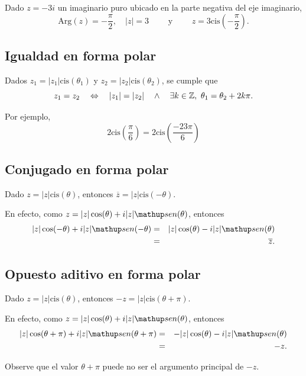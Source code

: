 \begin{ejemplo}{}{}
Dado $z = -3 i$ un imaginario puro ubicado en la parte  negativa del eje imaginario,
            \[
                \mbox{Arg}(z) = -\frac{\pi}{2},\quad |z| = 3
                \qquad \mbox{ y } \qquad
                z = 3 \mbox{cis}\left(-\frac{\pi}{2}\right).
            \]
\end{ejemplo}


\subsection{Igualdad en forma polar}

Dados $z_1 = |z_1| \mbox{cis}(\theta_1)$ y $z_2 = |z_2| \mbox{cis}(\theta_2)$,
se cumple que 
\begin{equation}\label{igualdadpolar}
    z_1 = z_2 \quad \Leftrightarrow \quad |z_1| = |z_2| \quad \wedge \quad \exists k\in\mathbb{Z},\ \theta_1 = \theta_2+2 k \pi.
\end{equation}

Por ejemplo,
\[
    2 \mbox{cis}\left(\frac{\pi}{6}\right)=
     2 \mbox{cis}\left(\frac{-23\pi}{6}\right)
\]

\subsection{Conjugado en forma polar}
Dado $z = |z| \mbox{cis}(\theta)$, entonces $\overline{z} = |z| \mbox{cis}(-\theta)$.

En efecto, como $z= |z| \cos(\theta) + i |z| \sen(\theta)$, entonces 
\begin{eqnarray*}
|z| \cos(-\theta) + i |z| \sen(-\theta)&=& |z| \cos(\theta) - i |z| \sen(\theta)\\
&=&\overline{z}.
\end{eqnarray*}

\subsection{Opuesto aditivo en forma polar}
Dado $z = |z| \mbox{cis}(\theta)$, entonces $-z = |z| \mbox{cis}(\theta+\pi)$.

En efecto, como $z= |z| \cos(\theta) + i |z| \sen(\theta)$, entonces 
\begin{eqnarray*}
|z| \cos(\theta+\pi) + i |z| \sen(\theta+\pi)&=& -|z| \cos(\theta) - i |z| \sen(\theta)\\
&=&-z.
\end{eqnarray*}

Observe que el valor $\theta+\pi$ puede no ser el argumento principal de $- z$.


